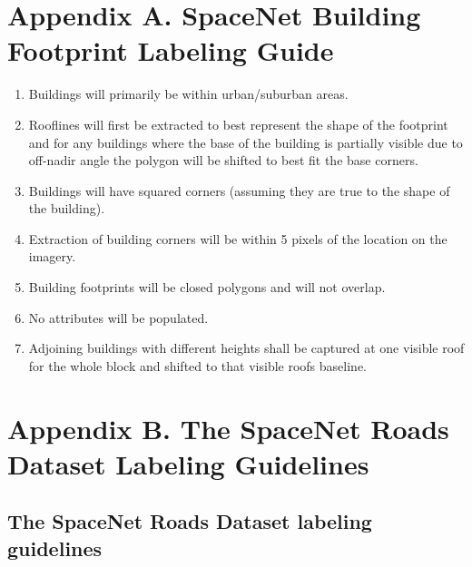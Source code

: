 \documentclass{article}
\begin{document}
\clearpage






\setcounter{secnumdepth}{0}


\newpage



\section{Appendix A.  SpaceNet Building Footprint Labeling Guide}

\begin{enumerate}
	\item Buildings will primarily be within urban/suburban areas.
	\item Rooflines will first be extracted to best represent the shape of the footprint and for any buildings where the base of the building is partially visible due to off-nadir angle the polygon will be shifted to best fit the base corners.
	\item Buildings will have squared corners (assuming they are true to the shape of the building).
	\item Extraction of building corners will be within 5 pixels of the location on the imagery.
	\item Building footprints will be closed polygons and will not overlap.
	\item No attributes will be populated.
	\item Adjoining buildings with different heights shall be captured at one visible roof for the whole block and shifted to that visible roofs baseline.
\end{enumerate}

\newpage

\section{Appendix B.  The SpaceNet Roads Dataset Labeling Guidelines}

\subsection{The SpaceNet Roads Dataset labeling guidelines}
\end{document}
